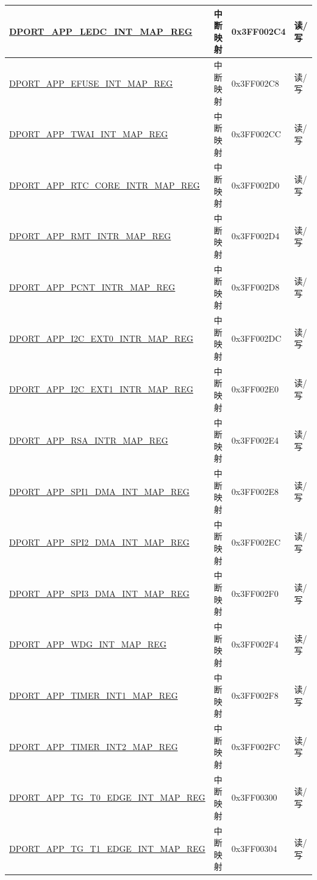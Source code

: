\begin{longtable}{|L{8.2cm}|L{4.5cm}| l | l | }
\hyperref[regdesc:APPLEDCINTMAPREG]{DPORT\_APP\_LEDC\_INT\_MAP\_REG} & 中断映射 & 0x3FF002C4 & 读/写 \\ \hline
\hyperref[regdesc:APPEFUSEINTMAPREG]{DPORT\_APP\_EFUSE\_INT\_MAP\_REG} & 中断映射 & 0x3FF002C8 & 读/写 \\ \hline
\hyperref[regdesc:APPCANINTMAPREG]{DPORT\_APP\_TWAI\_INT\_MAP\_REG} & 中断映射 & 0x3FF002CC & 读/写 \\ \hline
\hyperref[regdesc:APPRTCCOREINTRMAPREG]{DPORT\_APP\_RTC\_CORE\_INTR\_MAP\_REG} & 中断映射 & 0x3FF002D0 & 读/写 \\ \hline
\hyperref[regdesc:APPRMTINTRMAPREG]{DPORT\_APP\_RMT\_INTR\_MAP\_REG} & 中断映射 & 0x3FF002D4 & 读/写 \\ \hline
\hyperref[regdesc:APPPCNTINTRMAPREG]{DPORT\_APP\_PCNT\_INTR\_MAP\_REG} & 中断映射 & 0x3FF002D8 & 读/写 \\ \hline
\hyperref[regdesc:APPI2CEXT0INTRMAPREG]{DPORT\_APP\_I2C\_EXT0\_INTR\_MAP\_REG} & 中断映射 & 0x3FF002DC & 读/写 \\ \hline
\hyperref[regdesc:APPI2CEXT1INTRMAPREG]{DPORT\_APP\_I2C\_EXT1\_INTR\_MAP\_REG} & 中断映射 & 0x3FF002E0 & 读/写 \\ \hline
\hyperref[regdesc:APPRSAINTRMAPREG]{DPORT\_APP\_RSA\_INTR\_MAP\_REG} & 中断映射 & 0x3FF002E4 & 读/写 \\ \hline
\hyperref[regdesc:APPSPI1DMAINTMAPREG]{DPORT\_APP\_SPI1\_DMA\_INT\_MAP\_REG} & 中断映射 & 0x3FF002E8 & 读/写 \\ \hline
\hyperref[regdesc:APPSPI2DMAINTMAPREG]{DPORT\_APP\_SPI2\_DMA\_INT\_MAP\_REG} & 中断映射 & 0x3FF002EC & 读/写 \\ \hline
\hyperref[regdesc:APPSPI3DMAINTMAPREG]{DPORT\_APP\_SPI3\_DMA\_INT\_MAP\_REG} & 中断映射 & 0x3FF002F0 & 读/写 \\ \hline
\hyperref[regdesc:APPWDGINTMAPREG]{DPORT\_APP\_WDG\_INT\_MAP\_REG} & 中断映射 & 0x3FF002F4 & 读/写 \\ \hline
\hyperref[regdesc:APPTIMERINT1MAPREG]{DPORT\_APP\_TIMER\_INT1\_MAP\_REG} & 中断映射 & 0x3FF002F8 & 读/写 \\ \hline
\hyperref[regdesc:APPTIMERINT2MAPREG]{DPORT\_APP\_TIMER\_INT2\_MAP\_REG} & 中断映射 & 0x3FF002FC & 读/写 \\ \hline
\hyperref[regdesc:APPTGT0EDGEINTMAPREG]{DPORT\_APP\_TG\_T0\_EDGE\_INT\_MAP\_REG} & 中断映射 & 0x3FF00300 & 读/写 \\ \hline
\hyperref[regdesc:APPTGT1EDGEINTMAPREG]{DPORT\_APP\_TG\_T1\_EDGE\_INT\_MAP\_REG} & 中断映射 & 0x3FF00304 & 读/写 \\ \hline

\end{longtable}
